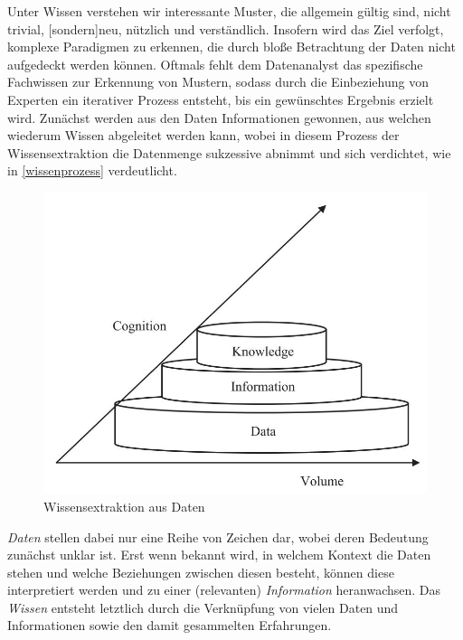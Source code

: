 \glqq Unter Wissen verstehen wir interessante Muster, die allgemein gültig sind, nicht trivial, [sondern]neu, nützlich und verständlich.\grqq{} Insofern wird das Ziel verfolgt, komplexe Paradigmen zu erkennen, die durch bloße Betrachtung der Daten nicht aufgedeckt werden können. Oftmals fehlt dem Datenanalyst das spezifische Fachwissen zur Erkennung von Mustern, sodass durch die Einbeziehung von Experten ein iterativer Prozess entsteht, bis ein gewünschtes Ergebnis erzielt wird. Zunächst werden aus den Daten Informationen gewonnen, aus welchen wiederum Wissen abgeleitet werden kann, wobei in diesem Prozess der Wissensextraktion die Datenmenge sukzessive abnimmt und sich verdichtet, wie in \vref{wissenprozess} verdeutlicht.

\begin{figure}[H]
\centering
\includegraphics[scale=1.3]{se-wa-jpg/wissenprozess}
\caption[Wissensextraktion aus Daten]{Wissensextraktion aus Daten\protect\footnotemark}
\label{wissenprozess}
\end{figure}

\textit{Daten} stellen dabei nur eine Reihe von Zeichen dar, wobei deren Bedeutung zunächst unklar ist. Erst wenn bekannt wird, in welchem Kontext die Daten stehen und welche Beziehungen zwischen diesen besteht, können diese interpretiert werden und zu einer (relevanten) \textit{Information} heranwachsen. Das \textit{Wissen} entsteht letztlich durch die Verknüpfung von vielen Daten und Informationen sowie den damit gesammelten Erfahrungen.

